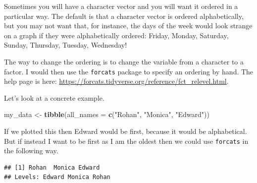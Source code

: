 \documentclass[
]{book}
\newenvironment{Shaded}{\begin{snugshade}}{\end{snugshade}}
\newcommand{\CommentTok}[1]{\textcolor[rgb]{0.56,0.35,0.01}{\textit{#1}}}
\newcommand{\DataTypeTok}[1]{\textcolor[rgb]{0.13,0.29,0.53}{#1}}
\newcommand{\KeywordTok}[1]{\textcolor[rgb]{0.13,0.29,0.53}{\textbf{#1}}}
\newcommand{\NormalTok}[1]{#1}
\newcommand{\OperatorTok}[1]{\textcolor[rgb]{0.81,0.36,0.00}{\textbf{#1}}}
\newcommand{\StringTok}[1]{\textcolor[rgb]{0.31,0.60,0.02}{#1}}
\begin{document}
Sometimes you will have a character vector and you will want it ordered in a particular way. The default is that a character vector is ordered alphabetically, but you may not want that, for instance, the days of the week would look strange on a graph if they were alphabetically ordered: Friday, Monday, Saturday, Sunday, Thursday, Tuesday, Wednesday!

The way to change the ordering is to change the variable from a character to a factor. I would then use the \texttt{forcats} package to specify an ordering by hand. The help page is here: \url{https://forcats.tidyverse.org/reference/fct_relevel.html}.

Let's look at a concrete example.

\begin{Shaded}
\begin{Highlighting}[]
\NormalTok{my_data <-}\StringTok{ }\KeywordTok{tibble}\NormalTok{(}\DataTypeTok{all_names =} \KeywordTok{c}\NormalTok{(}\StringTok{"Rohan"}\NormalTok{, }\StringTok{"Monica"}\NormalTok{, }\StringTok{"Edward"}\NormalTok{))}
\end{Highlighting}
\end{Shaded}

If we plotted this then Edward would be first, because it would be alphabetical. But if instead I want to be first as I am the oldest then we could use \texttt{forcats} in the following way.

\begin{Shaded}
\end{Shaded}

\begin{verbatim}
## [1] Rohan  Monica Edward
## Levels: Edward Monica Rohan
\end{verbatim}
\end{document}
